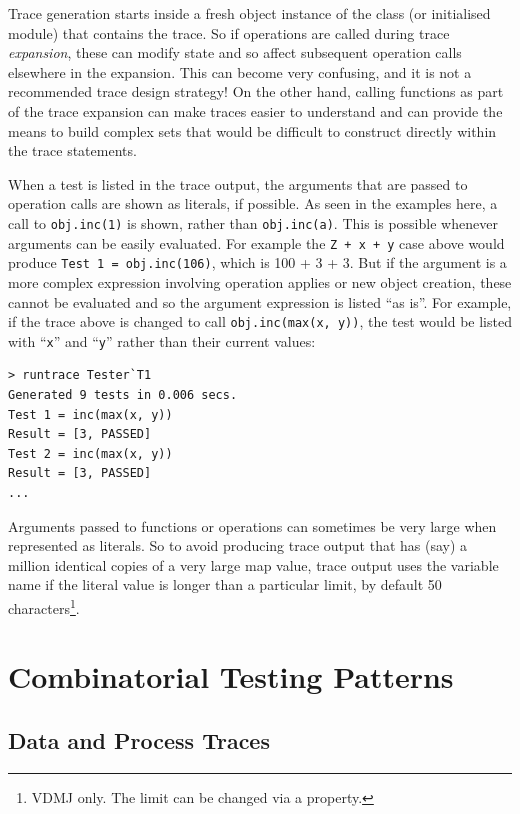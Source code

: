 \documentclass{overturerepchap}
\begin{document}
Trace generation starts inside a fresh object instance of the class (or
initialised module) that contains the trace. So if operations are called during
trace \emph{expansion}, these can modify state and so affect subsequent
operation calls elsewhere in the expansion. This can become very confusing, and
it is not a recommended trace design strategy! On the other hand, calling
functions as part of the trace expansion can make traces easier to understand
and can provide the means to build complex sets that would be difficult to
construct directly within the trace statements.

When a test is listed in the trace output, the arguments that are passed to
operation calls are shown as literals, if possible. As seen in the examples
here, a call to \texttt{obj.inc(1)} is shown, rather than \texttt{obj.inc(a)}. This is
possible whenever arguments can be easily evaluated. For example the \texttt{Z
+ x + y} case above would produce \texttt{Test 1 = obj.inc(106)}, which is 100 +
3 + 3. But if the argument is a more complex expression involving operation
applies or new object creation, these cannot be evaluated and so the argument
expression is listed ``as is''. For example, if the trace above is changed to
call \texttt{obj.inc(max(x, y))}, the test would be listed with ``\texttt{x}''
and ``\texttt{y}'' rather than their current values:

\small
\lstset{style=tool,language=}
\begin{lstlisting}[escapechar=@]
> runtrace Tester`T1
Generated 9 tests in 0.006 secs. 
Test 1 = inc(max(x, y))
Result = [3, PASSED]
Test 2 = inc(max(x, y))
Result = [3, PASSED]
...
\end{lstlisting}
\lstset{style=mystyle}
\lstset{language=VDM++}
\normalsize

\noindent Arguments passed to functions or operations can sometimes be very
large when represented as literals. So to avoid producing trace output that has (say)
a million identical copies of a very large map value, trace output uses the
variable name if the literal value is longer than a particular limit, by default
50 characters\footnote{VDMJ only. The limit can be changed via a property.}.

\chapter{Combinatorial Testing Patterns}
\label{chap:patterns}

\section{Data and Process Traces}
\label{chap:dataprocess}
\end{document}
